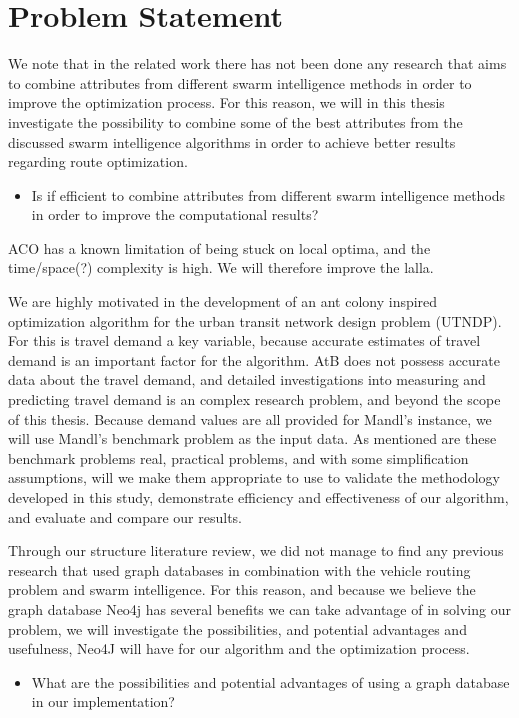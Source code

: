 \section{Problem Statement} 

We note that in the related work there has not been done any research that aims to combine attributes from different swarm intelligence methods in order to improve the optimization process. For this reason, we will in this thesis investigate the possibility to combine some of the best attributes from the discussed swarm intelligence algorithms in order to achieve better results regarding route optimization. 
\begin{itemize}
\item Is if efficient to combine attributes from different swarm intelligence methods in order to improve the computational results?
\end{itemize}

ACO has a known limitation of being stuck on local optima, and the time/space(?) complexity is high. We will therefore improve the lalla.

We are highly motivated in the development of an ant colony inspired optimization algorithm for the urban transit network design problem (UTNDP). For this is travel demand a key variable, because accurate estimates of travel demand is an important factor for the algorithm. AtB does not possess accurate data about the travel demand, and detailed investigations into measuring and predicting travel demand is an complex research problem, and beyond the scope of this thesis. Because demand values are all provided for Mandl's instance, we will use Mandl's benchmark problem \citep{mandl79} as the input data. As mentioned are these benchmark problems real, practical problems, and with some simplification assumptions, will we make them appropriate to use to validate the methodology developed in this study, demonstrate efficiency and effectiveness of our algorithm, and evaluate and compare our results. 

Through our structure literature review, we did not manage to find any previous research that used graph databases in combination with the vehicle routing problem and swarm intelligence. For this reason, and because we believe the graph database Neo4j \citep{website:neo4j} has several benefits we can take advantage of in solving our problem, we will investigate the possibilities, and potential advantages and usefulness, Neo4J will have for our algorithm and the optimization process.
\begin{itemize}
\item What are the possibilities and potential advantages of using a graph database in our implementation?
\end{itemize}

